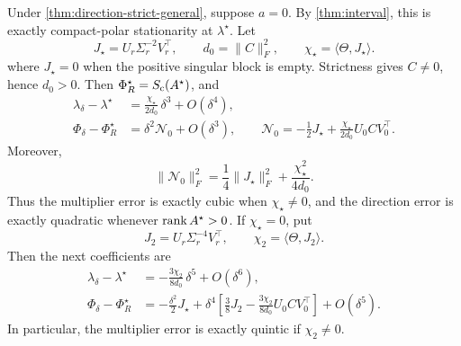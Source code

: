 \begin{corollary}
\label{cor:compact-root-superconvergence-main}
Under \cref{thm:direction-strict-general}, suppose \(a=0\).  By
\cref{thm:interval}, this is exactly compact-polar stationarity at
\(\lambda^\star\).  Let
\begin{equation}
 J_\star=U_r\Sigma_r^{-2}V_r^\top,
 \qquad d_0=\|C\|_F^2,
 \qquad \chi_\star=\langle\Theta,J_\star\rangle.
 \label{eq:compact-root-coefficients-main}
\end{equation}
where \(J_\star=0\) when the positive singular block is empty.  Strictness
gives \(C\ne0\), hence \(d_0>0\).
Then \(\Phi_R^\star=S_{\mathrm c}(A^\star)\), and
\begin{align}
 \lambda_\delta-\lambda^\star
 &=\frac{\chi_\star}{2d_0}\,\delta^3+O(\delta^4),
 \label{eq:compact-root-cubic-main}\\
 \Phi_\delta-\Phi_R^\star
 &=\delta^2\mathcal N_0+O(\delta^3),
 \qquad
 \mathcal N_0=-\frac12J_\star
 +\frac{\chi_\star}{2d_0}U_0CV_0^\top.
 \label{eq:compact-root-quadratic-main}
\end{align}
Moreover,
\begin{equation}
 \|\mathcal N_0\|_F^2
 =\frac14\|J_\star\|_F^2+\frac{\chi_\star^2}{4d_0}.
 \label{eq:compact-root-direction-norm-main}
\end{equation}
Thus the multiplier error is exactly cubic when \(\chi_\star\ne0\), and the
direction error is exactly quadratic whenever \(\operatorname{rank} A^\star>0\).  If
\(\chi_\star=0\), put
\begin{equation}
 J_2=U_r\Sigma_r^{-4}V_r^\top,
 \qquad \chi_2=\langle\Theta,J_2\rangle .
 \label{eq:compact-root-second-coefficients-main}
\end{equation}
Then the next coefficients are
\begin{align}
 \lambda_\delta-\lambda^\star
 &=-\frac{3\chi_2}{8d_0}\,\delta^5+O(\delta^6),
 \label{eq:compact-root-quintic-main}\\
 \Phi_\delta-\Phi_R^\star
 &=-\frac{\delta^2}{2}J_\star
 +\delta^4\left[\frac38J_2
 -\frac{3\chi_2}{8d_0}U_0CV_0^\top\right]+O(\delta^5).
 \label{eq:compact-root-quartic-main}
\end{align}
In particular, the multiplier error is exactly quintic if \(\chi_2\ne0\).
\end{corollary}

